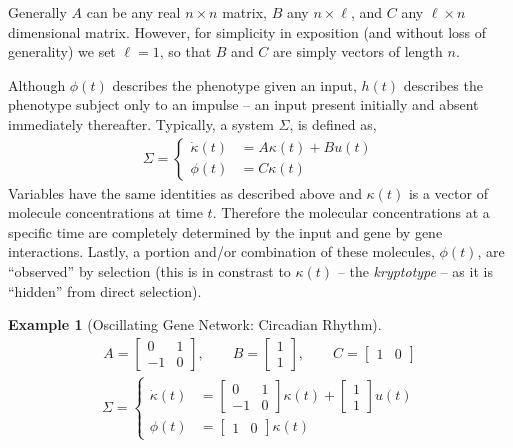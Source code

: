 \documentclass[9 pt]{article}
\newcommand{\1}{\mathbbm{1}}
\newtheorem{example}{Example}
\begin{document}
\begin{multicols}{2}
  Generally $A$ can be any real $n \times n$ matrix, $B$ any $n \times \ell$, and $C$ any $\ell \times n$ dimensional matrix. However, for simplicity in exposition (and without loss of generality) we set $\ell = 1$, so that $B$ and $C$ are simply vectors of length $n$.

  Although $\phi(t)$ describes the phenotype given an input, $h(t)$ describes the phenotype subject only to an impulse -- an input present initially and absent immediately thereafter. Typically, a system $\Sigma$, is defined as,
  \begin{align}
    \Sigma = \left\{ \begin{array}{ll} \dot{\kappa}(t) &= A \kappa(t) + B u(t) \\ \phi(t) &= C \kappa(t) \end{array} \right.
  \end{align}
  Variables have the same identities as described above and $\kappa(t)$ is a vector of molecule concentrations at time $t$. Therefore the molecular concentrations at a specific time are completely determined by the input and gene by gene interactions. Lastly, a portion and/or combination of these molecules, $\phi(t)$, are ``observed'' by selection (this is in constrast to $\kappa(t)$ -- the \emph{kryptotype} -- as it is ``hidden'' from direct selection).

  \begin{example}[Oscillating Gene Network: Circadian Rhythm]
    \begin{align*}
      A = \begin{bmatrix} 0 & 1 \\ -1 & 0 \end{bmatrix} , \qquad B = \begin{bmatrix} 1 \\ 1 \end{bmatrix}, \qquad C = \begin{bmatrix} 1 & 0 \end{bmatrix}
    \end{align*}
    \begin{align*}
      \Sigma = \left \{ \begin{array}{ll} \dot{\kappa}(t) &= \begin{bmatrix} 
        0 & 1 \\ 
       -1 & 0 
        \end{bmatrix} \kappa(t) + \begin{bmatrix} 1 \\ 1 \end{bmatrix} u(t) \\ 
          \phi(t) &= \begin{bmatrix} 1 & 0 \end{bmatrix} \kappa(t) \end{array} \right.
     \end{align*}


\end{example}
\end{multicols}
\end{document}
